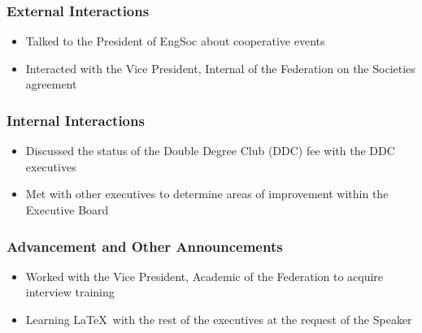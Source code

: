 \subsubsection*{External Interactions}
\begin{itemize}
\item Talked to the President of EngSoc about cooperative events
\item Interacted with the Vice President, Internal of the Federation on the Societies agreement
\end{itemize}

\subsubsection*{Internal Interactions}
\begin{itemize}
\item Discussed the status of the Double Degree Club (DDC) fee with the DDC executives
\item Met with other executives to determine areas of improvement within the Executive Board
\end{itemize}

\subsubsection*{Advancement and Other Announcements}
\begin{itemize}
\item Worked with the Vice President, Academic of the Federation to acquire interview training
\item Learning \LaTeX\ with the rest of the executives at the request of the Speaker
\end{itemize}